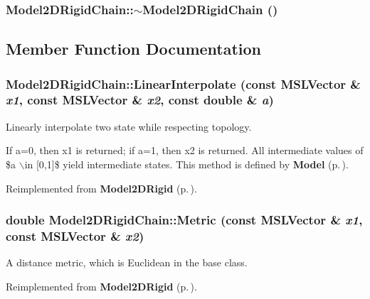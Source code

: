 \subsubsection{\setlength{\rightskip}{0pt plus 5cm}Model2DRigid\-Chain::$\sim$Model2DRigid\-Chain ()\hspace{0.3cm}{\tt  [inline, virtual]}}\label{classModel2DRigidChain_a1}




\subsection{Member Function Documentation}
\subsubsection{ Model2DRigid\-Chain::Linear\-Interpolate (const {\bf MSLVector} \& {\em x1}, const {\bf MSLVector} \& {\em x2}, const double \& {\em a})\hspace{0.3cm}{\tt  [virtual]}}\label{classModel2DRigidChain_a4}


Linearly interpolate two state while respecting topology.

If a=0, then x1 is returned; if a=1, then x2 is returned. All intermediate values of \$a $\backslash$in [0,1]\$ yield intermediate states. This method is defined by {\bf Model} {\rm (p.\,\pageref{classModel})}. 

Reimplemented from {\bf Model2DRigid} {\rm (p.\,\pageref{classModel2DRigid_a4})}.
\subsubsection{\setlength{\rightskip}{0pt plus 5cm}double Model2DRigid\-Chain::Metric (const {\bf MSLVector} \& {\em x1}, const {\bf MSLVector} \& {\em x2})\hspace{0.3cm}{\tt  [virtual]}}\label{classModel2DRigidChain_a5}


A distance metric, which is Euclidean in the base class.



Reimplemented from {\bf Model2DRigid} {\rm (p.\,\pageref{classModel2DRigid_a5})}.
